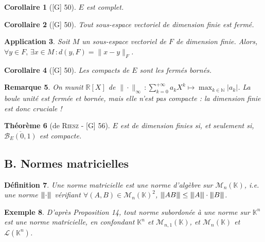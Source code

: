 \documentclass[10pt, a4paper, parskip=full, twoside, twocolumn]{report}
\newtheorem{definition}{Définition}
\newtheorem{theorem}[definition]{Théorème}
\newtheorem{corollary}[definition]{Corollaire}
\newtheorem{example}[definition]{Exemple}
\newtheorem{remark}[definition]{Remarque}
\newtheorem{application}[definition]{Application}
\newcommand{\IN}{\mathbb{N}}
\newcommand{\IK}{\mathbb{K}}
\newcommand{\IR}{\mathbb{R}}
\newcommand{\M}{\mathcal{M}}
\newcommand{\B}{\mathcal{B}}
\newcommand{\vertiii}[1]{{\left\vert\kern-0.25ex\left\vert\kern-0.25ex\left\vert #1 
    \right\vert\kern-0.25ex\right\vert\kern-0.25ex\right\vert}}
\begin{document}
\begin{corollary}[\textnormal{[G] 50}]
	$E$ est complet.
\end{corollary}

\begin{corollary}[\textnormal{[G] 50}]
	Tout sous-espace vectoriel de dimension finie est fermé.
\end{corollary}

\begin{application}
	Soit $M$ un sous-espace vectoriel de $F$ de dimension finie.
	Alors, $\forall y\in F,\,\exists x\in M\,\colon d(y,F) = \|x-y\|_F$.
\end{application}

\begin{corollary}[\textnormal{[G] 50}]
	Les compacts de $E$ sont les fermés bornés.
\end{corollary}

\begin{remark}
	On munit $\IR[X]$ de $\|\cdot\|_{\infty}\,\colon \sum_{k=0}^{+\infty}a_kX^k\mapsto \max_{k\in\IN} \vert a_k\vert$.
	La boule unité est fermée et bornée, mais elle n'est pas compacte : la dimension finie est donc cruciale !
\end{remark}

\begin{tcolorbox}[
    breakable, %
    colback=developpement, %
    colframe=gray!0!black, %
    boxrule=0pt, %
    arc=1mm, %
	boxsep=0pt,
	left=0pt, right=0pt, top=0pt, bottom=0pt
]
\begin{theorem}[de \textsc{Riesz} - \textnormal{[G] 56}]
	\label{208dev12}
	$E$ est de dimension finies si, et seulement si, $\overline{\B_E(0,1)}$ est compacte.
\end{theorem}
\end{tcolorbox}


\subsection*{B. Normes matricielles}

\begin{definition}
Une \emph{norme matricielle} est une norme d'algèbre sur $\M_n(\IK)$, \emph{i.e.} une norme $\vertiii{\cdot}$ vérifiant $\forall (A,B)\in\M_n(\IK)^2$, $\vertiii{AB}\leq \vertiii{A}\cdot\vertiii{B}$.
\end{definition}

\begin{example}
	D'après Proposition 14, tout norme subordonée à une norme sur $\IK^n$ est une norme matricielle, en confondant $\IK^n$ et $\M_{n,1}(\IK)$, et $\M_n(\IK)$ et $\mathcal{L}(\IK^n)$.
\end{example}
\end{document}
